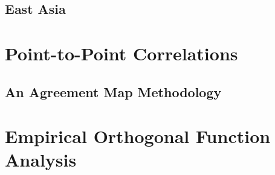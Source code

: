 \subsection{East Asia}

\section{Point-to-Point Correlations}

\subsection{An Agreement Map Methodology}

\section{Empirical Orthogonal Function Analysis}